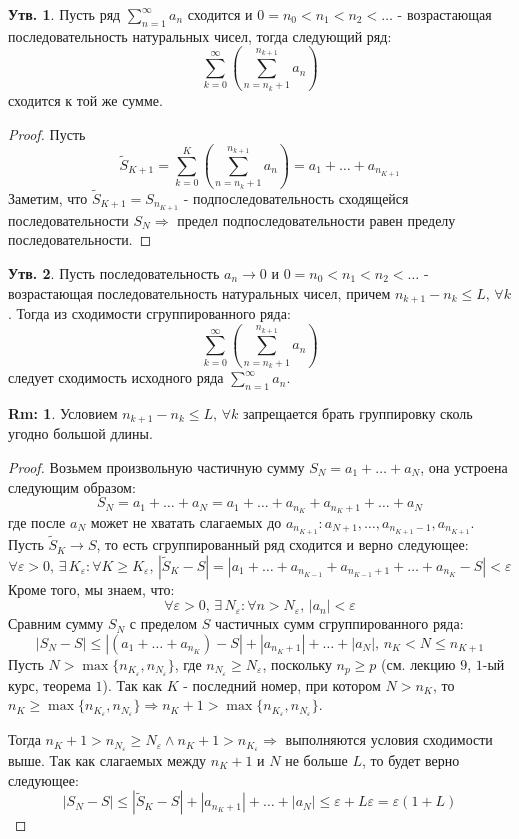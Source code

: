 \documentclass[12pt]{article}
\newcommand{\VE}{\varepsilon}
\theoremstyle{definition}
\newtheorem{rem}{Rm:}
\newtheorem{prop}{Утв.}
\newcommand{\ssum}[1]{\displaystyle \sum\limits_{n=1}^{\infty}{#1}_n}
\begin{document}
\begin{prop}
	Пусть ряд $\ssum{a}$ сходится и $0 = n_0 < n_1 < n_2 < \dotsc$ - возрастающая последовательность натуральных чисел, тогда следующий ряд:
	$$
		\sum\limits_{k = 0}^{\infty}\left(\sum\limits_{n = n_k + 1}^{n_{k+1}}a_n\right)
	$$
	сходится к той же сумме.
\end{prop}
\begin{proof}
	Пусть
	$$
		\widetilde{S}_{K+1} = \displaystyle \sum\limits_{k = 0}^{K}\left(\sum\limits_{n = n_k + 1}^{n_{k+1}}a_n\right) = a_1 + \dotsc + a_{n_{K+1}}
	$$ 
	Заметим, что $\widetilde{S}_{K+1} = S_{n_{K+1}}$ - подпоследовательность сходящейся последовательности $S_N \Rightarrow$ предел подпоследовательности равен пределу последовательности.
\end{proof}
\begin{prop}
	Пусть последовательность $a_n \to 0$ и $0 = n_0 < n_1 < n_2 < \dotsc$ - возрастающая последовательность натуральных чисел, причем $n_{k+1} - n_k \leq L, \, \forall k$. Тогда из сходимости сгруппированного ряда:
	$$
		\sum\limits_{k = 0}^{\infty}\left(\sum\limits_{n = n_k + 1}^{n_{k+1}}a_n\right)
	$$
	следует сходимость исходного ряда $\ssum{a}$.
\end{prop}
\begin{rem}
	Условием $n_{k+1} - n_k \leq L, \, \forall k$ запрещается брать группировку сколь угодно большой длины.
\end{rem}
\begin{proof}
	Возьмем произвольную частичную сумму $S_N = a_1 + \dotsc + a_N$, она устроена следующим образом:
	$$
		S_N = a_1 + \dotsc + a_N = a_1 + \dotsc + a_{n_K} + a_{n_K + 1} + \dotsc + a_N
	$$
	где после $a_N$ может не хватать слагаемых до $a_{n_{K+1}} \colon a_{N+1}, \dotsc, a_{n_{K+1} -1}, a_{n_{K+1}}$. Пусть $\widetilde{S}_K \to S$, то есть сгруппированный ряд сходится и верно следующее:
	$$
		\forall \VE > 0, \, \exists \, K_\VE \colon \forall K \geq K_\VE, \, |\widetilde{S}_K - S| = |a_1 + \dotsc + a_{n_{K-1}} + a_{n_{K-1} + 1} + \dotsc + a_{n_{K}} - S| < \VE	
	$$
	Кроме того, мы знаем, что:
	$$
		\forall \VE > 0, \, \exists \, N_\VE \colon \forall n > N_\VE, \, |a_n| < \VE
	$$
	Сравним сумму $S_N$ с пределом $S$ частичных сумм сгруппированного ряда:
	$$
		|S_N - S|\leq |(a_1 + \dotsc + a_{n_K}) - S| + |a_{n_K + 1}| + \dotsc + |a_N|, \, n_K < N \leq n_{K+1}
	$$
	Пусть $N > \max\{n_{K_\VE},n_{N_\VE}\}$, где $n_{N_\VE} \geq N_\VE$, поскольку $n_p \geq p$ (см. лекцию $9$, $1$-ый курс, теорема $1$). Так как $K$ - последний номер, при котором $N > n_K$, то $n_K \geq \max\{n_{K_\VE},n_{N_\VE}\} \Rightarrow n_{K} + 1 > \max\{n_{K_\VE},n_{N_\VE}\}$.
	
	Тогда $n_K + 1 > n_{N_\VE} \geq N_\VE \wedge n_K + 1 > n_{K_\VE}\Rightarrow$ выполняются условия сходимости выше. Так как слагаемых между $n_K + 1$ и $N$ не больше $L$, то будет верно следующее:
	$$
		|S_N - S| \leq |\widetilde{S}_K - S| + |a_{n_K + 1}| + \dotsc + |a_N| \leq \VE + L\VE = \VE(1+L)
	$$
\end{proof}
\end{document}
